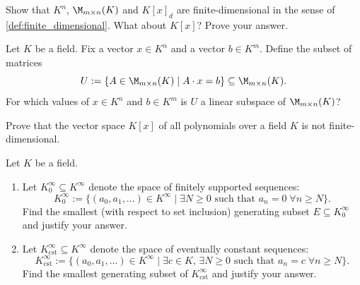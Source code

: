 \begin{exercise}
\label{exc:finite_dimensional_examples}
Show that $K^n$, $\M_{m \times n}(K)$ and $K[x]_d$ are finite-di\-men\-sional in the sense of \cref{def:finite_dimensional}. What about $K[x]$? Prove your answer.
\end{exercise}

\begin{exercise}
\label{exc:matrix_subspace_vector_constraint}
Let $K$ be a field. Fix a vector $x \in K^n$ and a vector $b \in K^m$. Define the subset of matrices
\[
U := \{A \in \M_{m \times n}(K) \mid A \cdot x = b\} \subseteq \M_{m \times n}(K).
\]
For which values of $x \in K^n$ and $b \in K^m$ is $U$ a linear subspace of $\M_{m \times n}(K)$?
\end{exercise}

\begin{exercise}
\label{exc:polynomial_space_infinite_dim}
Prove that the vector space $K[x]$ of all polynomials over a field $K$ is not finite-di\-men\-sional.
\end{exercise}

\begin{exercise}
\label{exc:generating_sets_sequences}
Let $K$ be a field.
\begin{enumerate}
    \item Let $K_0^\infty \subseteq K^\infty$ denote the space of finitely supported sequences:
    \[
    K_0^\infty := \{(a_0, a_1, \dots) \in K^\infty \mid \exists N \ge 0 \text{ such that } a_n = 0 \;\forall n \ge N\}.
    \]
    Find the smallest (with respect to set inclusion) generating subset $E \subseteq K_0^\infty$ and justify your answer.
    \item Let $K_{\mathrm{cst}}^\infty \subseteq K^\infty$ denote the space of eventually constant sequences:
    \[
    K_{\mathrm{cst}}^\infty := \{(a_0, a_1, \dots) \in K^\infty \mid \exists c \in K, \, \exists N \ge 0 \text{ such that } a_n = c \;\forall n \ge N\}.
    \]
    Find the smallest generating subset of $K_{\mathrm{cst}}^\infty$ and justify your answer.
\end{enumerate}
\end{exercise}

